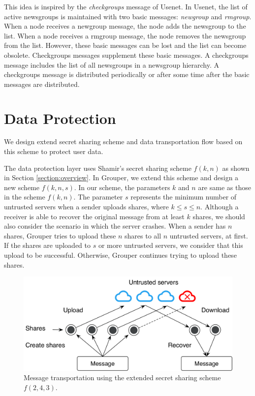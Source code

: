 \documentclass[a4paper,11pt]{report}
\begin{document}
This idea is inspired by the \emph{checkgroups} message of Usenet\cite{usenet}.
In Usenet, the list of active newsgroups is maintained with two basic messages: \emph{newgroup} and \emph{rmgroup}.
When a node receives a newgroup message, the node adds the newsgroup to the list.
When a node receives a rmgroup message, the node removes the newsgroup from the list.
However, these basic messages can be lost and the list can become obsolete.
Checkgroups messages supplement these basic messages.
A checkgroups message includes the list of all newsgroups in a newsgroup hierarchy.
A checkgroups message is distributed periodically or after some time after the basic messages are distributed.

\section{Data Protection}  \label{section:data_protection}

We design extend secret sharing scheme and data transportation flow based on this scheme to protect user data.

The data protection layer uses Shamir's secret sharing scheme $f(k, n)$ as shown in Section \ref{section:overview}.
In Grouper, we extend this scheme and design a new scheme $ f(k, n, s)$.
In our scheme, the parameters $k$ and $n$ are same as those in the scheme $f(k, n)$. 
The parameter $s$ represents the minimum number of untrusted servers when a sender uploads shares, where $k \leq s \leq n$.
Although a receiver is able to recover the original message from at least $k$ shares, we should also consider the scenario in which the server crashes. 
When a sender has $n$ shares, Grouper tries to upload these $n$ shares to all $n$ untrusted servers, at first. 
If the shares are uploaded to $s$ or more untrusted servers, we consider that this upload to be successful.
Otherwise, Grouper continues trying to upload these shares.

\begin{figure}[t]
	\centering
	\includegraphics[scale=0.65]{transportation}
	\caption{Message transportation using the extended secret sharing scheme $f(2, 4, 3)$.}
	\label{fig:transportation}
\end{figure}
\end{document}
